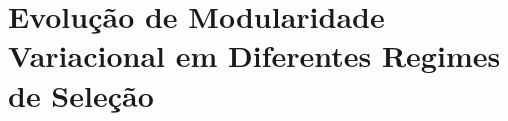 \pagestyle{empty}
\cleardoublepage
\pagestyle{fancy}
\chapter{Evolução de Modularidade Variacional em Diferentes Regimes de
Seleção}\label{cap4}

